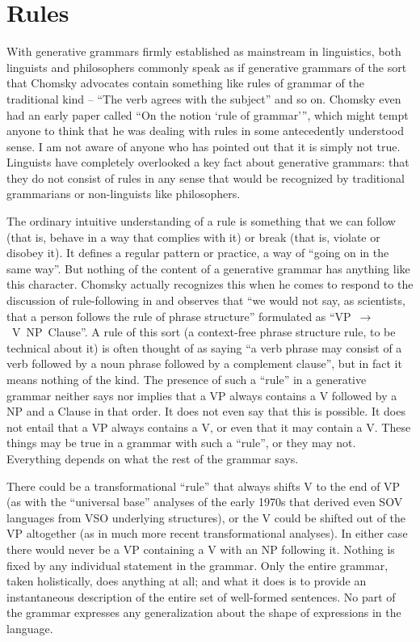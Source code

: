 \documentclass[output=paper]{langscibook}
\begin{document}
\section{Rules}
\label{sec:pullum:rules}

With generative grammars firmly established as mainstream in linguistics, both linguists and philosophers commonly speak as if generative grammars of the sort that Chomsky advocates contain something like rules of grammar of the traditional kind – ``The verb agrees with the subject'' and so on. Chomsky even had an early paper called ``On the notion `rule of grammar'\thinspace'', which might tempt anyone to think that he was dealing with rules in some antecedently understood sense. I am not aware of anyone who has pointed out that it is simply not true. Linguists have completely overlooked a key fact about generative grammars: that they do not consist of rules in any sense that would be recognized by traditional grammarians or non-linguists like philosophers.

The ordinary intuitive understanding of a rule is something that we can follow (that is, behave in a way that complies with it) or break (that is, violate or disobey it).  It defines a regular pattern or practice, a way of ``going on in the same way''.  But nothing of the content of a generative grammar has anything like this character. Chomsky actually recognizes this when he comes to respond to the discussion of rule-following in \citet{Kripke82} and observes \citep[243]{Chomsky86KL} that ``we would not say, as scientists, that a person follows the rule of phrase structure'' formulated as ``VP~$\rightarrow$~V~NP~Clause''.  A rule of this sort (a context-free phrase structure rule, to be technical about it) is often thought of as saying ``a verb phrase may consist of a verb followed by a noun phrase followed by a complement clause'', but in fact it means nothing of the kind.  The presence of such a ``rule'' in a generative grammar neither says nor implies that a VP always contains a V followed by a NP and a Clause in that order.  It does not even say that this is possible.  It does not entail that a VP always contains a V, or even that it may contain a V.  These things may be true in a grammar with such a ``rule'', or they may not. Everything depends on what the rest of the grammar says.

There could be a transformational ``rule'' that always shifts V to the end of VP (as with the ``universal base'' analyses of the early 1970s that derived even SOV languages from VSO underlying structures), or the V could be shifted out of the VP altogether (as in much more recent transformational analyses).  In either case there would never be a VP containing a V with an NP following it. Nothing is fixed by any individual statement in the grammar. Only the entire grammar, taken holistically, does anything at all; and what it does is to provide an instantaneous description of the entire set of well-formed sentences. No part of the grammar expresses any generalization about the shape of expressions in the language.
\end{document}

